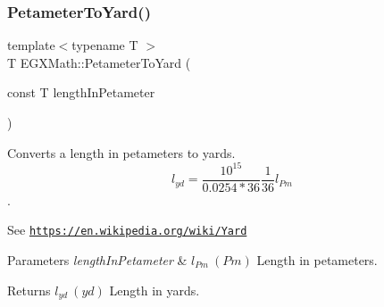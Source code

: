 \subsubsection{\texorpdfstring{Petameter\+To\+Yard()}{PetameterToYard()}}
{\footnotesize\ttfamily template$<$typename T $>$ \\
T E\+G\+X\+Math\+::\+Petameter\+To\+Yard (\begin{DoxyParamCaption}\item[{const T}]{length\+In\+Petameter }\end{DoxyParamCaption})}



Converts a length in petameters to yards. \[ l_{yd}= \frac{10^{15}}{0.0254 * 36} \frac{1}{36} l_{Pm} \]. 

See \href{https://en.wikipedia.org/wiki/Yard}{\tt https\+://en.\+wikipedia.\+org/wiki/\+Yard} 
\begin{DoxyParams}{Parameters}
{\em length\+In\+Petameter} & $ l_{Pm}\ (Pm)$ Length in petameters. \\
\hline
\end{DoxyParams}
\begin{DoxyReturn}{Returns}
$ l_{yd}\ (yd)$ Length in yards. 
\end{DoxyReturn}
